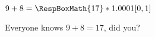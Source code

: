   \item{} $9+8=\RespBoxMath{17}*{1}{.0001}{[0,1]}$
\begin{solution}
Everyone knows $9+8=17$, did you?
\end{solution}
